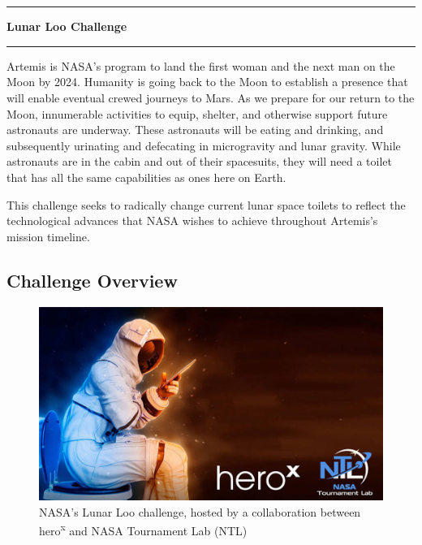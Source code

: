 \pagebreak
\chapter[Lunar Loo Challenge]{}\vspace{-2cm}\noindent\rule{\textwidth}{2.5pt}
\thispagestyle{empty}

\vspace{5cm}\textbf{\huge{Lunar Loo Challenge}}

\medskip\noindent\rule{\textwidth}{1pt}

Artemis is NASA’s program to land the first woman and the next man on the Moon by 2024.  Humanity is going back to the Moon to establish a presence that will enable eventual crewed journeys to Mars.  As we prepare for our return to the Moon, innumerable activities to equip, shelter, and otherwise support future astronauts are underway.  These astronauts will be eating and drinking, and subsequently urinating and defecating in microgravity and lunar gravity.  While astronauts are in the cabin and out of their spacesuits, they will need a toilet that has all the same capabilities as ones here on Earth.  

This challenge seeks to radically change current lunar space toilets to reflect the technological advances that NASA wishes to achieve throughout Artemis's mission timeline.

\pagebreak

\section{Challenge Overview}

\begin{figure}[h]
    \centering
    \includegraphics[width = \linewidth]{figs/lunarloologo.jpg}
    \caption[NASA's Lunar Loo Challenge]{NASA's Lunar Loo challenge, hosted by a collaboration between  hero\textsuperscript{x} and NASA Tournament Lab (NTL)}
\end{figure}

